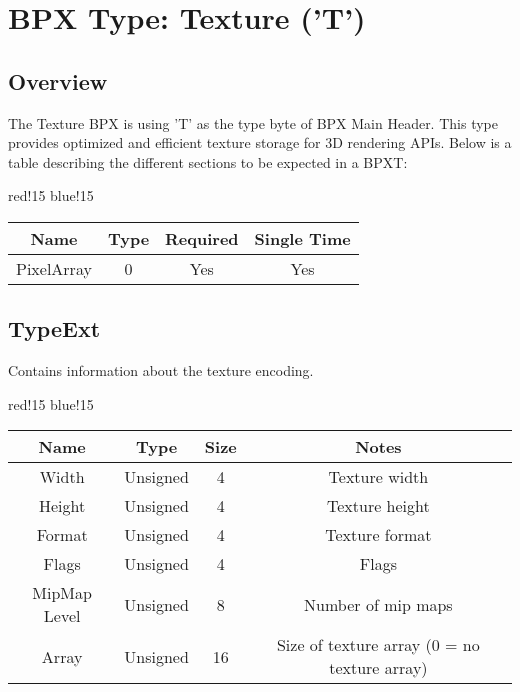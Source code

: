 \section{BPX Type: Texture ('T')}

\subsection{Overview}
The Texture BPX is using 'T' as the type byte of BPX Main Header. This type provides optimized and efficient texture storage for 3D rendering APIs.
\newline
Below is a table describing the different sections to be expected in a BPXT:
\begin{center}
    {
        {red!15}
        {blue!15}
        \begin{tabular}{|c|c|c|c|}
            \hline
            \textbf{Name} & \textbf{Type} & \textbf{Required} & \textbf{Single Time} \\

            \hline\hline
            PixelArray & 0 & Yes & Yes \\
            \hline
        \end{tabular}
    }
\end{center}

\subsection{TypeExt}
Contains information about the texture encoding.
\begin{center}
    {
        {red!15}
        {blue!15}
        \begin{tabular}{|c|c|c|c|}
            \hline
            \textbf{Name} & \textbf{Type} & \textbf{Size} & \textbf{Notes} \\
    
            \hline\hline
            Width & Unsigned & 4 & Texture width \\
            Height & Unsigned & 4 & Texture height \\
            Format & Unsigned & 4 & Texture format \\
            Flags & Unsigned & 4 & Flags \\
            MipMap Level & Unsigned & 8 & Number of mip maps \\
            Array & Unsigned & 16 & Size of texture array (0 = no texture array) \\
            \hline
        \end{tabular}
    }
\end{center}

